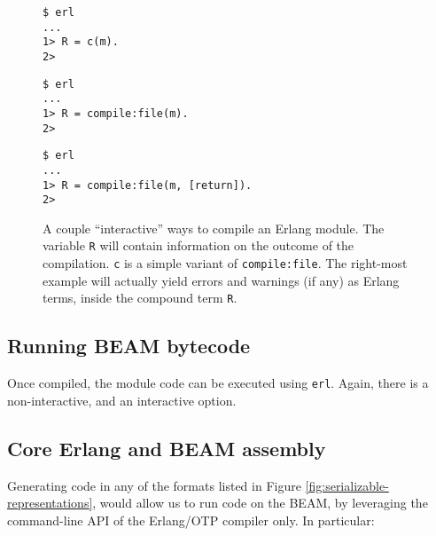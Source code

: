\begin{figure}[h!]
\begin{minipage}[t]{0.2\textwidth}
\begin{lstlisting}
$ erl
...
1> R = c(m).
2>
\end{lstlisting}
\end{minipage}%
\begin{minipage}[t]{0.35\textwidth}
\begin{lstlisting}
$ erl
...
1> R = compile:file(m).
2>
\end{lstlisting}
\end{minipage}%
\begin{minipage}[t]{0.45\textwidth}
\begin{lstlisting}
$ erl
...
1> R = compile:file(m, [return]).
2>
\end{lstlisting}
\end{minipage}%
\caption{A couple ``interactive'' ways to compile an Erlang module.
The variable \texttt{R} will contain information on the outcome of the
compilation. \texttt{c} is a simple variant of \texttt{compile:file}.
The right-most example will actually yield errors and warnings (if
any) as Erlang terms, inside the compound term \texttt{R}.}
\label{fig:erl-c}
\end{figure}

\subsection{Running BEAM bytecode}

Once compiled, the module code can be executed using \texttt{erl}.
Again, there is a non-interactive, and an interactive option.

\subsection{Core Erlang and BEAM assembly}

Generating code in any of the formats listed in Figure
\ref{fig:serializable-representations}, would allow us to run code on
the BEAM, by leveraging the command-line API of the Erlang/OTP
compiler only. In particular:

